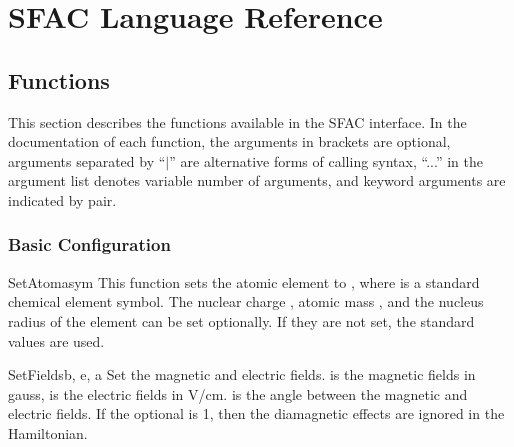 \chapter{SFAC Language Reference}
\label{cha:function}

\section{Functions}
\label{sec:fac}

This section describes the functions available in the SFAC interface. In the
documentation of each function, the arguments in brackets are optional,
arguments separated by ``$\mid$'' are alternative forms of calling syntax,
``...'' in the argument list denotes variable number of arguments, and keyword
arguments are indicated by  pair.

\subsection{Basic Configuration}

\begin{fundesc}{SetAtom}{asym}
This function sets the atomic element to , where  is a
standard chemical element symbol. The nuclear charge , atomic mass
, and the nucleus radius of the element can be set optionally. If they
are not set, the standard values are used.
\end{fundesc}

\begin{fundesc}{SetFields}{b, e, a}
Set the magnetic and electric fields.  is the magnetic fields in gauss,
 is the electric fields in V/cm.  is the angle between the
magnetic and electric fields. If the optional  is 1, then the
diamagnetic effects are ignored in the Hamiltonian.
\end{fundesc}

